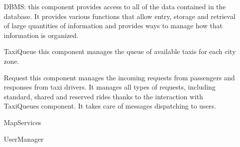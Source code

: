 \begin{itemize}
	\item[DBMS:] this component provides access to all of the data contained in the database. It provides various functions that allow entry, storage and retrieval of large quantities of information and provides ways to manage how that information is organized.
	\item[TaxiQueue] this component manages the queue of available taxis for each city zone. 
	\item[Request] this component manages the incoming requests from passengers and responses from taxi drivers. It manages all types of requests, including standard, shared and reserved rides thanks to the interaction with TaxiQueues component. It takes care of messages dispatching to users.
	\item[MapServices] 
	\item[UserManager]
\end{itemize}